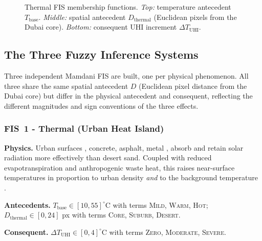 \documentclass[conference]{IEEEtran}
\begin{document}
\begin{figure}[!h]
\caption{Thermal FIS membership functions.  \emph{Top:} temperature
antecedent \(T_{\mathrm{base}}\).  \emph{Middle:} spatial antecedent
\(D_{\mathrm{thermal}}\) (Euclidean pixels from the Dubai core).
\emph{Bottom:} consequent UHI increment \(\Delta T_{\mathrm{UHI}}\).}
\label{fig:thermal_mf}
\end{figure}

\subsection{The Three Fuzzy Inference Systems}
\label{sec:fis}

Three independent Mamdani FIS are built, one per physical phenomenon.
All three share the same spatial antecedent \(D\) (Euclidean pixel
distance from the Dubai core) but differ in the physical antecedent and
consequent, reflecting the different magnitudes and sign conventions of
the three effects.

\subsubsection{FIS~1 - Thermal (Urban Heat Island)}

\textbf{Physics.}  Urban surfaces ,  concrete, asphalt, metal ,  absorb
and retain solar radiation more effectively than desert sand.  Coupled
with reduced evapotranspiration and anthropogenic waste heat, this raises
near-surface temperatures in proportion to urban density
\emph{and} to the background temperature
\cite{oke2017urban,santamouris2013urban}.

\textbf{Antecedents.}
\(T_{\mathrm{base}}\in[10,55]^{\circ}\mathrm{C}\) with terms
\textsc{Mild}, \textsc{Warm}, \textsc{Hot};
\(D_{\mathrm{thermal}}\in[0,24]\) px with terms
\textsc{Core}, \textsc{Suburb}, \textsc{Desert}.

\textbf{Consequent.}
\(\Delta T_{\mathrm{UHI}}\in[0,4]^{\circ}\mathrm{C}\) with terms
\textsc{Zero}, \textsc{Moderate}, \textsc{Severe}.
\end{document}
